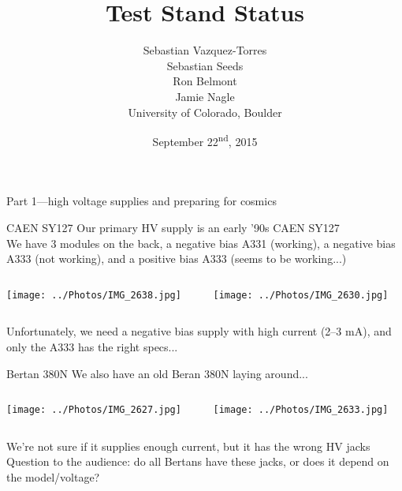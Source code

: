 \documentclass[compress,8pt]{beamer} %
\title[sPHENIX HCal meeting, Sept 22, 2015 - Slide \insertframenumber]{Test Stand Status}
\author[CU-Boulder]{Sebastian Vazquez-Torres \\ Sebastian Seeds \\ Ron Belmont \\ Jamie Nagle \\ \vspace{20pt} University of Colorado, Boulder}
\date{September 22\textsuperscript{nd}, 2015}
\begin{document}
\begin{frame}
\titlepage
\end{frame}






%




\begin{frame}
Part 1---high voltage supplies and preparing for cosmics
\end{frame}



\begin{frame}{CAEN SY127}
Our primary HV supply is an early '90s CAEN SY127 \\
We have 3 modules on the back, a negative bias A331 (working), a negative bias A333 (not working), and a positive bias A333 (seems to be working...) \\
\vspace{10pt}
\begin{columns}
\begin{column}{0.55\linewidth}
\texttt{[image: ../Photos/IMG\_2638.jpg]}
\end{column}
\begin{column}{0.45\linewidth}
\texttt{[image: ../Photos/IMG\_2630.jpg]}\\
\end{column}
\end{columns}
\vspace{10pt}
Unfortunately, we need a negative bias supply with high current (2--3 mA), and only the A333 has the right specs...
\end{frame}



\begin{frame}{Bertan 380N}
We also have an old Beran 380N laying around... \\
\vspace{10pt}
\begin{columns}
\begin{column}{0.5\linewidth}
\texttt{[image: ../Photos/IMG\_2627.jpg]}
\end{column}
\begin{column}{0.5\linewidth}
\texttt{[image: ../Photos/IMG\_2633.jpg]}\\
\end{column}
\end{columns}
\vspace{10pt}
We're not sure if it supplies enough current, but it has the wrong HV jacks \\
Question to the audience: do all Bertans have these jacks, or does it depend on the model/voltage?
\end{frame}
\end{document}
